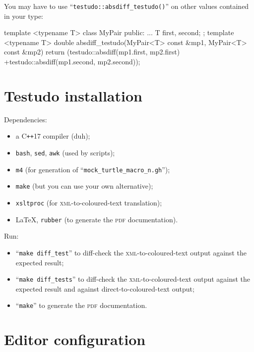 \documentclass[twoside, a4paper, article]{memoir}
\newcommand*\Cpp{C\texttt{++}}
\begin{document}
You may have to use ``\texttt{testudo::absdiff\_testudo()}'' on other values
contained in your type:
\begin{cpplisting}
template <typename T>
class MyPair {
public:
  ...
  T first, second;
};
template <typename T>
double absdiff_testudo(MyPair<T> const &mp1,
                       MyPair<T> const &mp2) {
  return (testudo::absdiff(mp1.first, mp2.first)
          +testudo::absdiff(mp1.second, mp2.second));
}
\end{cpplisting}


\cleartooddpage

\appendices

\chapter{Testudo installation}
\label{cha:testudo-installation}

Dependencies:
\begin{itemize}
\item a \Cpp{}17 compiler (duh);
\item \texttt{bash}, \texttt{sed}, \texttt{awk} (used by scripts);
\item \texttt{m4} (for generation of ``\texttt{mock\_turtle\_macro\_n.gh}'');
\item \texttt{make} (but you can use your own alternative);
\item \texttt{xsltproc} (for \textsc{xml}-to-coloured-text translation);
\item \LaTeX{}, \texttt{rubber} (to generate the \textsc{pdf} documentation).
\end{itemize}

Run:
\begin{itemize}
\item ``\texttt{make diff\_test}'' to diff-check the
  \textsc{xml}-to-coloured-text output against the expected result;
\item ``\texttt{make diff\_tests}'' to diff-check the
  \textsc{xml}-to-coloured-text output against the expected result and against
  direct-to-coloured-text output;
\item ``\texttt{make}'' to generate the \textsc{pdf} documentation.
\end{itemize}


\chapter{Editor configuration}
\label{cha:editor-configuration}
\end{document}
